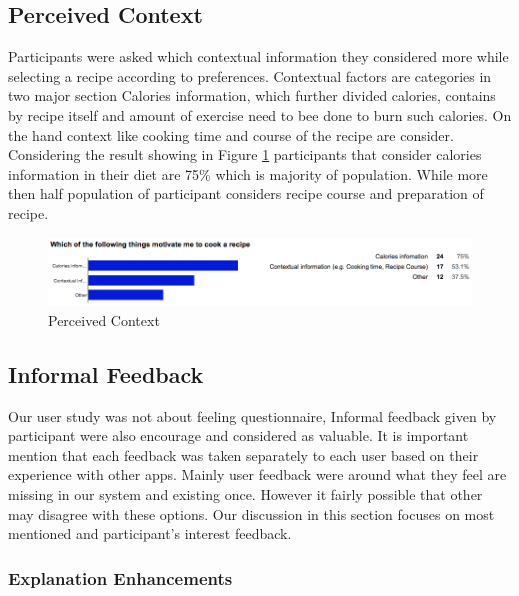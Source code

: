 \subsection{Perceived Context}

Participants were asked which contextual information they considered more while selecting a recipe according to preferences. Contextual factors are categories in two major section Calories information, which further divided calories, contains by recipe itself and amount of exercise need to bee done to burn such calories. On the hand context like cooking time and course of the recipe are consider. Considering the result showing in Figure \ref{fig:ch5_stat_context} participants that consider calories information in their diet are 75\% which is majority of population. While more then half population of participant considers recipe course and preparation of recipe. 

\begin{figure}[h]
	\centering
	\includegraphics[width= 1\linewidth]{figures/ch5_stat_context}
	\caption{Perceived Context}
	\label{fig:ch5_stat_context}
\end{figure}

\subsection{Informal Feedback}

Our user study was not about feeling questionnaire, Informal feedback given by participant were also encourage and considered as valuable. It is important mention that each feedback was taken separately to each user based on their experience with other apps. Mainly user feedback were around what they feel are missing in our system and existing once. However it fairly possible that other may disagree with these options. Our discussion in this section focuses on most mentioned and participant’s interest feedback. \newline

\subsubsection{Explanation Enhancements}

